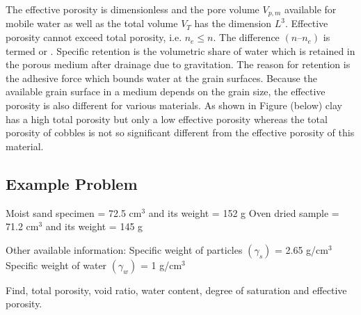 \documentclass[letterpaper,10pt,english]{jupyterBook}
\let\sphinxpxdimen\pdfpxdimen\else\newdimen\sphinxpxdimen
\begin{document}
The effective porosity is dimensionless and the pore volume \(V_{p,m}\) available for mobile water as well as the total volume \(V_T\) has the dimension \(L^3\). Effective porosity cannot exceed total porosity, i.e. \(n_e \leq n\). The difference \((n – n_e)\) is termed  or . Specific retention is the volumetric share of water which is retained in the porous medium after drainage due to gravitation.  The reason for retention is the adhesive force which bounds water at the grain surfaces. Because the available grain surface in a medium depends on the grain size, the effective porosity is also different for various materials. As shown in Figure (below) clay has a high total porosity but only a low effective porosity whereas the total porosity of cobbles is not so significant different from the effective porosity of this material.

\noindent{\hspace*{\fill}\sphinxincludegraphics[height=400\sphinxpxdimen]{{L03_f_5}.png}\hspace*{\fill}}


\subsection{Example Problem}
\label{\detokenize{content/flow/L3/13_gw_storage:example-problem}}
\sphinxAtStartPar
Moist sand specimen = 72.5 cm\(^3\) and its weight = 152 g
Oven dried sample = 71.2 cm\(^3\) and its weight = 145 g

\sphinxAtStartPar
Other available information:
Specific weight of particles \((\gamma_s)\) = 2.65 g/cm\(^3\)
Specific weight of water \((\gamma_w)\) = 1 g/cm\(^3\)

\sphinxAtStartPar
Find, total porosity, void ratio, water content, degree of saturation and effective porosity.
\end{document}
